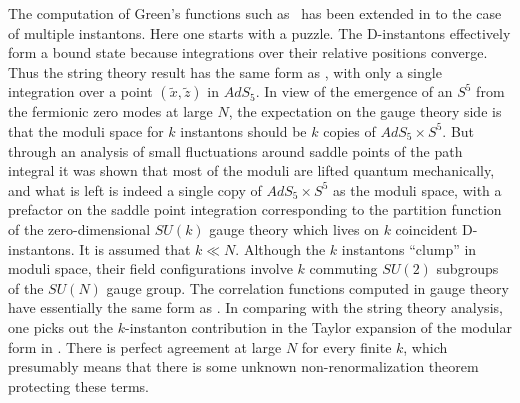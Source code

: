 The computation of Green's functions such as \SixteenAnswer\ has been
extended in \cite{Dorey:1999pd} to the case of multiple instantons.  Here
one starts with a puzzle.  The D-instantons effectively form a bound state
because integrations over their relative positions converge.  Thus the
string theory result has the same form as \SixteenAnswer, with only a
single integration over a point $(\tilde{x},\tilde{z})$ in $AdS_5$.  In view 
of the emergence of an $S^5$ from the fermionic zero modes at large $N$, the 
expectation on the
gauge theory side is that the moduli space for $k$
instantons should be $k$ copies of $AdS_5 \times S^5$.  But through an
analysis of small fluctuations around saddle points of the path integral it
was shown that most of the moduli are lifted quantum mechanically, and what
is left is indeed a single copy of $AdS_5 \times S^5$ as the moduli space,
with a prefactor on the saddle point integration corresponding to the
partition function of the zero-dimensional $SU(k)$ gauge theory which lives
on $k$ coincident D-instantons.  It is assumed that $k \ll N$.  Although
the $k$ instantons ``clump'' in moduli space, their field configurations
involve $k$ commuting $SU(2)$ subgroups of the $SU(N)$ gauge group.  The
correlation functions computed in gauge theory have essentially the same
form as \SixteenAnswer.  In comparing with the string theory analysis, one
picks out the $k$-instanton contribution in the Taylor expansion of the
modular form in \SixteenLambda.  There is perfect agreement at large $N$
for every finite $k$, which presumably means that there is some unknown
non-renormalization theorem protecting these terms.

